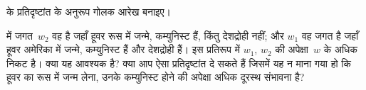 \documentclass[../../../include/open-logic-section]{subfiles}
\begin{document}
\begin{prob}
 के प्रतिदृष्टांत के अनुरूप
गोलक आरेख बनाइए।
\end{prob}

\begin{prob}
   में जगत~$w_2$ वह है जहाँ
  हूवर रूस में जन्मे, कम्युनिस्ट हैं, किंतु देशद्रोही नहीं; और $w_1$ वह
  जगत है जहाँ हूवर अमेरिका में जन्मे, कम्युनिस्ट हैं और देशद्रोही हैं। इस
  प्रतिरूप में $w_1$, $w_2$ की अपेक्षा~$w$ के अधिक निकट है। क्या यह
  आवश्यक है? क्या आप ऐसा प्रतिदृष्टांत दे सकते हैं जिसमें यह न माना गया
  हो कि हूवर का रूस में जन्म लेना, उनके कम्युनिस्ट होने की अपेक्षा अधिक
  दूरस्थ संभावना है?
\end{prob}
\end{document}
